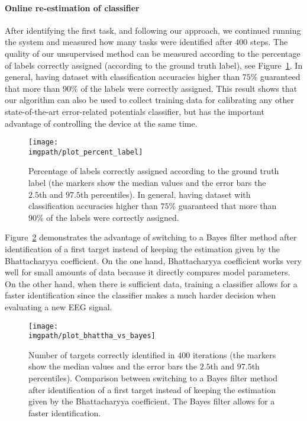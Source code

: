 \paragraph{Online re-estimation of classifier}
After identifying the first task, and following our approach, we continued running the system and measured how many tasks were identified after $400$ steps. The quality of our unsupervised method can be measured according to the percentage of labels correctly assigned (according to the ground truth label), see Figure~\ref{fig:percentageLabels}. In general, having dataset with classification accuracies higher than $75\%$ guaranteed that more than $90\%$ of the labels were correctly assigned. This result shows that our algorithm can also be used to collect training data for calibrating any other state-of-the-art error-related potentials classifier, but has the important advantage of controlling the device at the same time.

\begin{figure}[!ht]
    \centering
        \texttt{[image: \\imgpath/plot\_percent\_label]}
        \caption{Percentage of labels correctly assigned according to the ground truth label (the markers show the median values and the error bars the $2.5$th and $97.5$th percentiles). In general, having dataset with classification accuracies higher than $75\%$ guaranteed that more than $90\%$ of the labels were correctly assigned.}
        \label{fig:percentageLabels}
\end{figure}

Figure~\ref{fig:bhatta} demonstrates the advantage of switching to a Bayes filter method after identification of a first target instead of keeping the estimation given by the Bhattacharyya coefficient. On the one hand, Bhattacharyya coefficient works very well for small amounts of data because it directly compares model parameters. On the other hand, when there is sufficient data, training a classifier allows for a faster identification since the classifier makes a much harder decision when evaluating a new EEG signal.

\begin{figure}[!ht]
    \centering
        \texttt{[image: \\imgpath/plot\_bhattha\_vs\_bayes]}
        \caption{Number of targets correctly identified in $400$ iterations (the markers show the median values and the error bars the $2.5$th and $97.5$th percentiles). Comparison between switching to a Bayes filter method after identification of a first target instead of keeping the estimation given by the Bhattacharyya coefficient. The Bayes filter allows for a faster identification.}
        \label{fig:bhatta}
\end{figure} 

